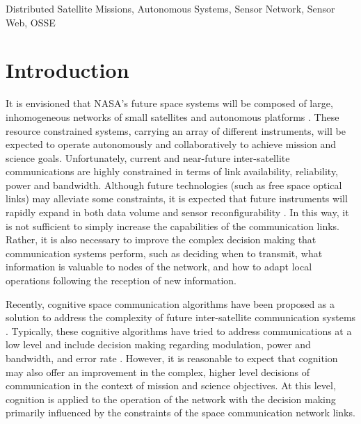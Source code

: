 \documentclass[conference]{IEEEtran}
\begin{document}
\begin{IEEEkeywords}
Distributed Satellite Missions, Autonomous Systems, Sensor Network, Sensor Web, OSSE
\end{IEEEkeywords}


\section{Introduction}
\label{sec:intro}

It is envisioned that NASA's future space systems will be composed of large,
inhomogeneous networks of small satellites and autonomous platforms \cite{ref1}.  These
resource constrained systems, carrying an array of different instruments, will
be expected to operate autonomously and collaboratively to achieve mission and
science goals.  Unfortunately, current and near-future inter-satellite
communications are highly constrained in terms of link availability,
reliability, power and bandwidth.  Although future technologies (such as free
space optical links) may alleviate some constraints, it is expected that future
instruments will rapidly expand in both data volume and sensor
reconfigurability \cite{ref2}.  In this way, it is not sufficient to simply increase the
capabilities of the communication links.  Rather, it is also necessary to
improve the complex decision making that communication systems perform, such as
deciding when to transmit, what information is valuable to nodes of the network,
and how to adapt local operations following the reception of new information.

Recently, cognitive space communication algorithms have been proposed as a
solution to address the complexity of future inter-satellite communication
systems \cite{ref3}.  Typically, these cognitive algorithms have tried to address
communications at a low level and include decision making regarding modulation,
power and bandwidth, and error rate \cite{ref4,ref5}.  However, it is reasonable to expect that
cognition may also offer an improvement in the complex, higher level decisions
of communication in the context of mission and science objectives.  At this
level, cognition is applied to the operation of the network with the decision
making primarily influenced by the constraints of the space communication
network links.
\end{document}
